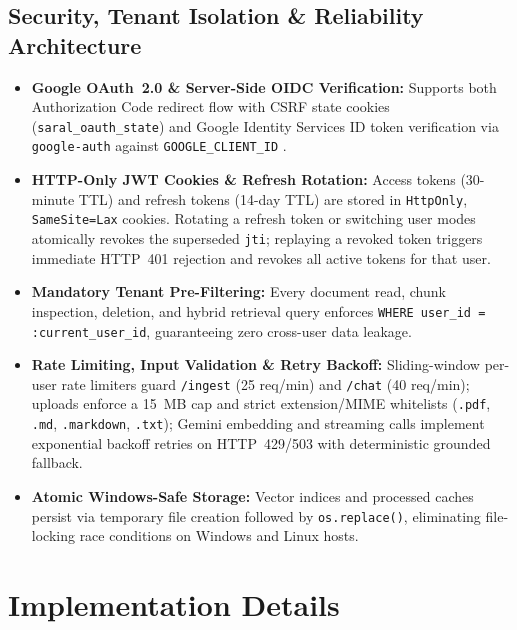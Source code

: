 \documentclass[12pt,a4paper,oneside]{report}
\begin{document}
\section{Security, Tenant Isolation \& Reliability Architecture}
\begin{itemize}[itemsep=2pt]
    \item \textbf{Google OAuth~2.0 \& Server-Side OIDC Verification:} Supports both Authorization Code redirect flow with CSRF state cookies (\texttt{saral\_oauth\_state}) and Google Identity Services ID token verification via \texttt{google-auth} against \texttt{GOOGLE\_CLIENT\_ID} \cite{rfc6749}.
    \item \textbf{HTTP-Only JWT Cookies \& Refresh Rotation:} Access tokens (30-minute TTL) and refresh tokens (14-day TTL) \cite{rfc7519} are stored in \texttt{HttpOnly}, \texttt{SameSite=Lax} cookies. Rotating a refresh token or switching user modes atomically revokes the superseded \texttt{jti}; replaying a revoked token triggers immediate HTTP~401 rejection and revokes all active tokens for that user.
    \item \textbf{Mandatory Tenant Pre-Filtering:} Every document read, chunk inspection, deletion, and hybrid retrieval query enforces \texttt{WHERE user\_id = :current\_user\_id}, guaranteeing zero cross-user data leakage.
    \item \textbf{Rate Limiting, Input Validation \& Retry Backoff:} Sliding-window per-user rate limiters guard \texttt{/ingest} (25 req/min) and \texttt{/chat} (40 req/min); uploads enforce a 15~MB cap and strict extension/MIME whitelists (\texttt{.pdf}, \texttt{.md}, \texttt{.markdown}, \texttt{.txt}); Gemini embedding and streaming calls implement exponential backoff retries on HTTP~429/503 with deterministic grounded fallback.
    \item \textbf{Atomic Windows-Safe Storage:} Vector indices and processed caches persist via temporary file creation followed by \texttt{os.replace()}, eliminating file-locking race conditions on Windows and Linux hosts.
\end{itemize}

\chapter{Implementation Details}
\end{document}
